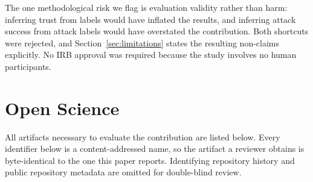 \documentclass[letterpaper,twocolumn,10pt]{article}
\begin{document}
The one methodological risk we flag is evaluation validity rather than harm:
inferring trust from labels would have inflated the results, and inferring attack
success from attack labels would have overstated the contribution. Both
shortcuts were rejected, and Section~\ref{sec:limitations} states the resulting
non-claims explicitly. No IRB approval was required because the study involves
no human participants.

\cleardoublepage

\section*{Open Science}

All artifacts necessary to evaluate the contribution are listed below. Every
identifier below is a content-addressed name, so the artifact a reviewer
obtains is byte-identical to the one this paper reports. Identifying
repository history and public repository metadata are omitted for double-blind
review.
\end{document}
